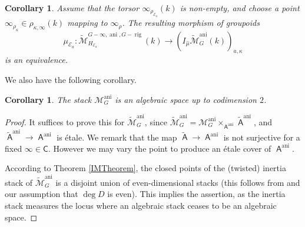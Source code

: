 \documentclass{article}
\DeclareMathOperator{\rig}{rig}
\DeclareMathOperator{\A}{\mathsf{A}}
\DeclareMathOperator{\ani}{ani}
\newcommand{\C}{\mathsf{C}}
\newcommand{\Mc}{\mathcal{M}}
\newcommand{\CE}{{\mathcal E}}
\theoremstyle{definition}
\theoremstyle{plain}
\newtheorem{corollary}[definition]{Corollary}
\begin{document}
\begin{corollary}\label{kappa_IMTheoremTwisted}
Assume that the torsor $\infty_{\rho_{\CE_a}}(k)$ is non-empty, and choose a point $\infty_{\rho_\kappa} \in \rho_{\kappa,\infty}(k)$ mapping to $\infty_\rho$. The resulting morphism of groupoids
\begin{equation*}
 \mu_{\CE_a} \colon  \widetilde{\mathcal{M}}^{G-\infty,\ani,G-\rig}_{H_{\CE_a}}(k) \to \left(I_{\hat\mu}\widetilde{\mathcal{M}}^{\ani}_G(k)\right)_{a,\kappa}
\end{equation*}
is an equivalence.
\end{corollary} 

We also have the following corollary. 

\begin{corollary}\label{cor:codimension2}
The stack $\Mc_G^{\ani}$ is an algebraic space up to codimension $2$.
\end{corollary}

\begin{proof}
It suffices to prove this for $\widetilde{\Mc}_G^{\ani}$, since $\widetilde{\Mc}_G^{\ani} = \Mc_G^{\ani} \times_{\A^{\ani}} \widetilde{\A}^{\ani}$, and $\widetilde{\A}^{\ani} \to \A^{\ani}$ is \'etale. We remark that the map $\widetilde{\A} \to \A^{\ani}$ is not surjective for a fixed $\infty \in \C$. However we may vary the point to produce an \'etale cover of $\A^{\ani}$.

According to Theorem \ref{IMTheorem}, the closed points of the (twisted) inertia stack of $\widetilde{\Mc}_G^{\ani}$ is a disjoint union of even-dimensional stacks (this follows from \cite[4.13.4]{MR2653248} and our assumption that $\deg D$ is even). This implies the assertion, as the inertia stack measures the locus where an algebraic stack ceases to be an algebraic space.
\end{proof}
\end{document}
